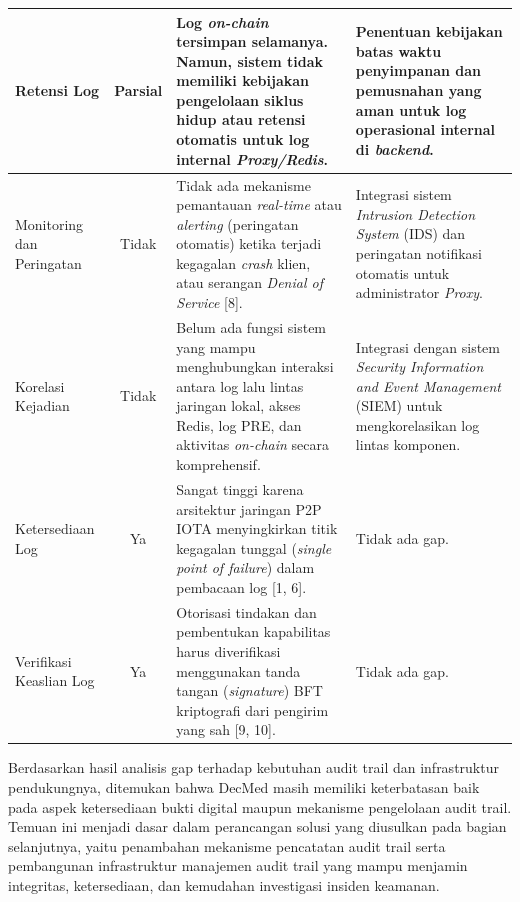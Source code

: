 \begin{table}[htbp]
\begin{tabular}{|p{3cm}|c|p{3.5cm}|p{3.5cm}|}
    Retensi Log &
    Parsial &
    Log \textit{on-chain} tersimpan selamanya. Namun, sistem tidak memiliki kebijakan pengelolaan siklus hidup atau retensi otomatis untuk log internal \textit{Proxy/Redis}. &
    Penentuan kebijakan batas waktu penyimpanan dan pemusnahan yang aman untuk log operasional internal di \textit{backend}. \\
    \hline

    Monitoring dan Peringatan &
    Tidak &
    Tidak ada mekanisme pemantauan \textit{real-time} atau \textit{alerting} (peringatan otomatis) ketika terjadi kegagalan \textit{crash} klien, atau serangan \textit{Denial of Service} [8]. &
    Integrasi sistem \textit{Intrusion Detection System} (IDS) dan peringatan notifikasi otomatis untuk administrator \textit{Proxy}. \\
    \hline

    Korelasi Kejadian &
    Tidak &
    Belum ada fungsi sistem yang mampu menghubungkan interaksi antara log lalu lintas jaringan lokal, akses Redis, log PRE, dan aktivitas \textit{on-chain} secara komprehensif. &
    Integrasi dengan sistem \textit{Security Information and Event Management} (SIEM) untuk mengkorelasikan log lintas komponen. \\
    \hline

    Ketersediaan Log &
    Ya &
    Sangat tinggi karena arsitektur jaringan P2P IOTA menyingkirkan titik kegagalan tunggal (\textit{single point of failure}) dalam pembacaan log [1, 6]. &
    Tidak ada gap. \\
    \hline

    Verifikasi Keaslian Log &
    Ya &
    Otorisasi tindakan dan pembentukan kapabilitas harus diverifikasi menggunakan tanda tangan (\textit{signature}) BFT kriptografi dari pengirim yang sah [9, 10]. &
    Tidak ada gap. \\
    \hline

    \end{tabular}
\end{table}

Berdasarkan hasil analisis gap terhadap kebutuhan audit trail dan infrastruktur pendukungnya, ditemukan bahwa DecMed masih memiliki keterbatasan baik pada aspek ketersediaan bukti digital maupun mekanisme pengelolaan audit trail. Temuan ini menjadi dasar dalam perancangan solusi yang diusulkan pada bagian selanjutnya, yaitu penambahan mekanisme pencatatan audit trail serta pembangunan infrastruktur manajemen audit trail yang mampu menjamin integritas, ketersediaan, dan kemudahan investigasi insiden keamanan.